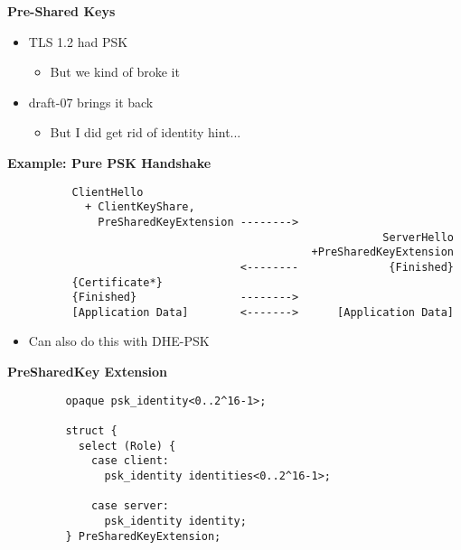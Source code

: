 \documentclass[helvetica]{seminar}
\newcommand{\heading}[1]{%
  \begin{center} 
    \large\bf 
    #1 
  \end{center} 
  \vspace{.4 in}}
\begin{document}
\begin{slide}
\heading{Pre-Shared Keys}

\begin{itemize}
\item TLS 1.2 had PSK
  \begin{itemize}
  \item But we kind of broke it
  \end{itemize}

\item draft-07 brings it back
  \begin{itemize}
  \item But I did get rid of identity hint...
  \end{itemize}
\end{itemize}
\end{slide}


\begin{slide}
\heading{Example: Pure PSK Handshake}

\begin{footnotesize}
\begin{verbatim}
          ClientHello
            + ClientKeyShare,
              PreSharedKeyExtension -------->
                                                          ServerHello
                                               +PreSharedKeyExtension
                                    <--------              {Finished}
          {Certificate*}
          {Finished}                -------->
          [Application Data]        <------->      [Application Data]
\end{verbatim}
\end{footnotesize}

\begin{itemize}
\item Can also do this with DHE-PSK
\end{itemize}
\end{slide}


\begin{slide}
\heading{PreSharedKey Extension}

\begin{footnotesize}
\begin{verbatim}
         opaque psk_identity<0..2^16-1>;

         struct {
           select (Role) {
             case client:
               psk_identity identities<0..2^16-1>;

             case server:
               psk_identity identity;
         } PreSharedKeyExtension;
\end{verbatim}
\end{footnotesize}
\end{slide}
\end{document}
